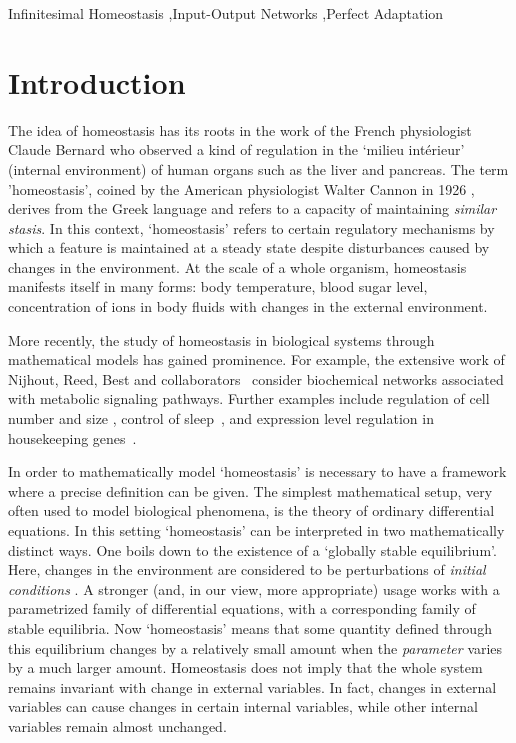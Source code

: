 \documentclass[a4paper,fleqn]{cas-dc}
\begin{document}
\begin{keywords}
Infinitesimal Homeostasis \sep Input-Output Networks \sep Perfect Adaptation
\end{keywords}

\maketitle


\section{Introduction}
\label{sec:INTRO}

The idea of homeostasis has its roots in the work of the French physiologist Claude Bernard \cite{bernard1865} who observed a kind of regulation in the `milieu int\'erieur' (internal environment) of human organs such as the liver and pancreas.
The term 'homeostasis', coined by the American physiologist Walter Cannon in 1926 \cite{cannon1929,cannon1939}, derives from the Greek language and refers to a capacity of maintaining \emph{similar stasis}.
In this context, `homeostasis' refers to certain regulatory mechanisms by which a feature is maintained at a steady state despite disturbances caused by changes in the environment.
At the scale of a whole organism, homeostasis manifests itself in many forms: body
temperature, blood sugar level, concentration of ions in body fluids with changes in the external environment. 

More recently, the study of homeostasis in biological systems through mathematical models has gained prominence.
For example, the extensive work of Nijhout, Reed, Best and collaborators~\cite{nrbu2004,best2009,nr2014,nbr2015,nbr2018} consider biochemical networks associated with metabolic signaling pathways.
Further examples include regulation of cell number and size \cite{lloyd2013}, control of sleep~\cite{wyatt1999}, and expression level regulation in housekeeping genes~\cite{antoneli2018}.  

In order to mathematically model `homeostasis' is necessary to have a framework where a precise definition can be given.
The simplest mathematical setup, very often used to model biological phenomena, is the theory of ordinary differential equations.
In this setting `homeostasis' can be interpreted in two mathematically distinct ways.  
One boils down to the existence of a `globally stable equilibrium'. 
Here, changes in the environment are considered to be perturbations of \emph{initial conditions} \cite{thomas1990}.
A stronger (and, in our view, more appropriate) usage works with a parametrized family of differential equations, with a corresponding family of stable equilibria.  
Now `homeostasis' means that some quantity defined through this equilibrium changes by a relatively small amount when the {\em parameter} varies by a much larger amount.
Homeostasis does not imply that the whole system remains invariant with change in external variables. 
In fact, changes in external variables can cause changes in certain internal variables, while other internal variables remain almost unchanged.
 
\end{document}

